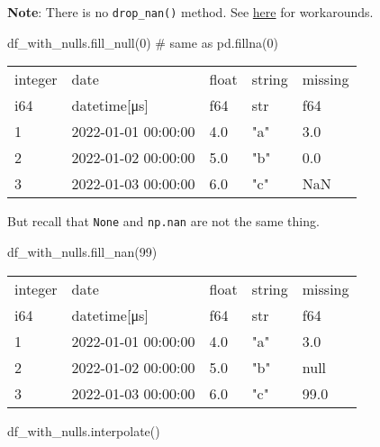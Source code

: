 \documentclass[
  letterpaper,
  DIV=11,
  numbers=noendperiod]{scrartcl}
\newenvironment{Shaded}{\begin{snugshade}}{\end{snugshade}}
\newcommand{\CommentTok}[1]{\textcolor[rgb]{0.37,0.37,0.37}{#1}}
\newcommand{\DecValTok}[1]{\textcolor[rgb]{0.68,0.00,0.00}{#1}}
\newcommand{\NormalTok}[1]{\textcolor[rgb]{0.00,0.23,0.31}{#1}}
\begin{document}
\textbf{Note}: There is no \texttt{drop\_nan()} method. See
\href{https://stackoverflow.com/questions/75548444/polars-dataframe-drop-nans}{here}
for workarounds.

\begin{Shaded}
\begin{Highlighting}[]
\NormalTok{df\_with\_nulls.fill\_null(}\DecValTok{0}\NormalTok{) }\CommentTok{\# same as pd.fillna(0)}
\end{Highlighting}
\end{Shaded}

\begin{longtable}[]{@{}lllll@{}}
\toprule()
integer & date & float & string & missing \\
i64 & datetime{[}μs{]} & f64 & str & f64 \\
\midrule()
\endhead
1 & 2022-01-01 00:00:00 & 4.0 & "a" & 3.0 \\
2 & 2022-01-02 00:00:00 & 5.0 & "b" & 0.0 \\
3 & 2022-01-03 00:00:00 & 6.0 & "c" & NaN \\
\bottomrule()
\end{longtable}

But recall that \texttt{None} and \texttt{np.nan} are not the same
thing.

\begin{Shaded}
\begin{Highlighting}[]
\NormalTok{df\_with\_nulls.fill\_nan(}\DecValTok{99}\NormalTok{)}
\end{Highlighting}
\end{Shaded}

\begin{longtable}[]{@{}lllll@{}}
\toprule()
integer & date & float & string & missing \\
i64 & datetime{[}μs{]} & f64 & str & f64 \\
\midrule()
\endhead
1 & 2022-01-01 00:00:00 & 4.0 & "a" & 3.0 \\
2 & 2022-01-02 00:00:00 & 5.0 & "b" & null \\
3 & 2022-01-03 00:00:00 & 6.0 & "c" & 99.0 \\
\bottomrule()
\end{longtable}

\begin{Shaded}
\begin{Highlighting}[]
\NormalTok{df\_with\_nulls.interpolate()}
\end{Highlighting}
\end{Shaded}
\end{document}
